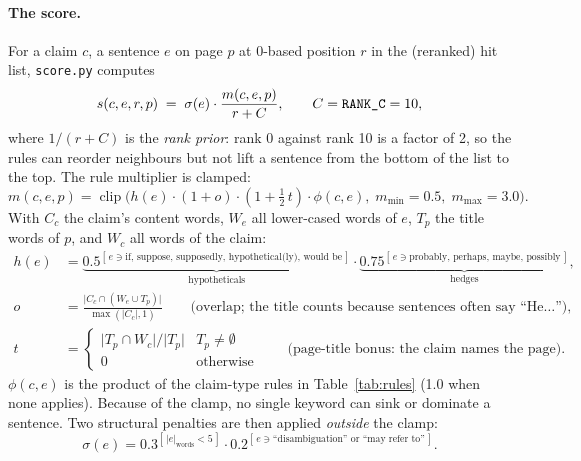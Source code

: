 \documentclass[11pt,a4paper]{article}
\makeatletter
\DeclareRobustCommand{\_}{\ifmmode\nfss@text{\textunderscore}\else\textunderscore\allowbreak\fi}
\newcommand{\file}[1]{\texttt{#1}}
\makeatother
\begin{document}
\paragraph{The score.} For a claim $c$, a sentence $e$ on page $p$ at 0-based position $r$ in the (reranked) hit list,
\file{score.py} computes
\[
  s(c,e,r,p) \;=\; \sigma(e)\cdot\frac{m(c,e,p)}{r + C}, \qquad C=\texttt{RANK\_C}=10,
\]
where $1/(r+C)$ is the \emph{rank prior}: rank 0 against rank 10 is a factor of 2, so the rules can reorder
neighbours but not lift a sentence from the bottom of the list to the top. The rule multiplier is clamped:
\[
  m(c,e,p) = \operatorname{clip}\!\Big(h(e)\cdot(1+o)\cdot(1+\tfrac12\,t)\cdot\phi(c,e),\; m_{\min}=0.5,\; m_{\max}=3.0\Big).
\]
With $C_c$ the claim's content words, $W_e$ all lower-cased words of $e$, $T_p$ the title words of $p$, and $W_c$ all
words of the claim:
\begin{align*}
  h(e) &= \underbrace{0.5^{[\,e \ni \text{if, suppose, supposedly, hypothetical(ly), would be}\,]}}_{\text{hypotheticals}}
          \cdot \underbrace{0.75^{[\,e\ni\text{probably, perhaps, maybe, possibly}\,]}}_{\text{hedges}},\\[2pt]
  o &= \frac{\lvert C_c \cap (W_e \cup T_p)\rvert}{\max(\lvert C_c\rvert, 1)}
       \qquad\text{(overlap; the title counts because sentences often say ``He\ldots'')},\\[2pt]
  t &= \begin{cases} \lvert T_p \cap W_c\rvert / \lvert T_p\rvert & T_p\neq\emptyset\\ 0 & \text{otherwise}\end{cases}
       \qquad\text{(page-title bonus: the claim names the page)}.
\end{align*}
$\phi(c,e)$ is the product of the claim-type rules in Table~\ref{tab:rules} (1.0 when none applies). Because of the
clamp, no single keyword can sink or dominate a sentence. Two structural penalties are then applied
\emph{outside} the clamp:
\[
  \sigma(e) = 0.3^{[\,|e|_\text{words}<5\,]}\cdot 0.2^{[\,e \ni \text{``disambiguation'' or ``may refer to''}\,]} .
\]
\end{document}
